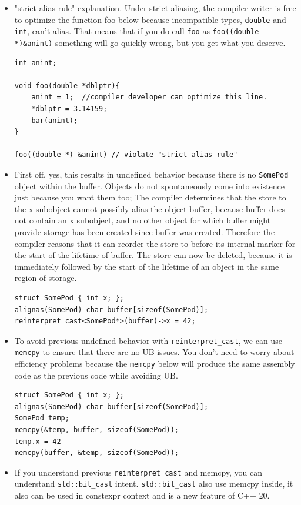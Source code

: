 \documentclass[a4paper,11pt,twoside]{book}
\begin{document}
\begin{itemize}
	\item "strict alias rule" explanation. Under strict aliasing, the compiler writer is free to optimize the function foo below because incompatible types, \texttt{double} and \texttt{int}, can't alias. That means that if you do call \texttt{foo} as \texttt{foo((double *)\&anint)} something will go quickly wrong, but you get what you deserve.
\begin{lstlisting}
int anint;

void foo(double *dblptr){
	anint = 1;  //compiler developer can optimize this line.
	*dblptr = 3.14159;
	bar(anint);
}

foo((double *) &anint) // violate "strict alias rule"
\end{lstlisting}
	
	\item First off, yes, this results in undefined behavior because there is no \texttt{SomePod} object within the buffer. Objects do not spontaneously come into existence just because you want them too; The compiler determines that the store to the x subobject cannot possibly alias the object buffer, because buffer does not contain an x subobject, and no other object for which buffer might provide storage has been created since buffer was created. Therefore the compiler reasons that it can reorder the store to before its internal marker for the start of the lifetime of buffer. The store can now be deleted, because it is immediately followed by the start of the lifetime of an object in the same region of storage.
\begin{lstlisting}
struct SomePod { int x; };
alignas(SomePod) char buffer[sizeof(SomePod)];
reinterpret_cast<SomePod*>(buffer)->x = 42;
\end{lstlisting}
	
	\item To avoid previous undefined behavior with \texttt{reinterpret\_cast}, we can use \texttt{memcpy} to ensure that there are no UB issues. You don't need to worry about efficiency problems because the \texttt{memcpy} below will produce the same assembly code as the previous code while avoiding UB.
	
\begin{lstlisting}
struct SomePod { int x; };
alignas(SomePod) char buffer[sizeof(SomePod)];
SomePod temp;
memcpy(&temp, buffer, sizeof(SomePod));
temp.x = 42
memcpy(buffer, &temp, sizeof(SomePod));	
\end{lstlisting}

	
	\item If you understand previous \texttt{reinterpret\_cast} and memcpy, you can understand \texttt{std::bit\_cast} intent. \texttt{std::bit\_cast} also use memcpy inside, it also can be used in constexpr context and is a new feature of C++ 20.
	

\end{itemize}
\end{document}
